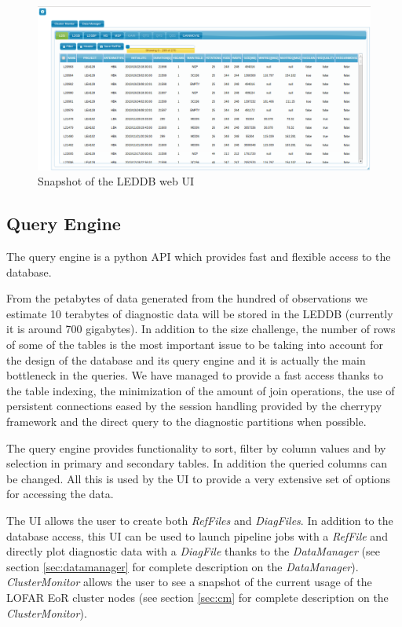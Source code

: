 \documentclass[a4paper,11pt]{article}
\begin{document}
\begin{figure}[h]
	\centering
	\includegraphics[scale=0.45]{fig/initwebui} 
	\caption{Snapshot of the LEDDB web UI}
	\label{fig:initwebui}
\end{figure}

\subsection{Query Engine}

The query engine is a python API which provides fast and flexible access to the database.

From the petabytes of data generated from the hundred of observations we estimate 10 terabytes of diagnostic data will be stored in the LEDDB (currently it is around 700 gigabytes). In addition to the size challenge, the number of rows of some of the tables is the most important issue to be taking into account for the design of the database and its query engine and it is actually the main bottleneck in the queries. We have managed to provide a fast access thanks to the table indexing, the minimization of the amount of join operations, the use of persistent connections eased by the session handling provided by the cherrypy framework and the direct query to the diagnostic partitions when possible.

The query engine provides functionality to sort, filter by column values and by selection in primary and secondary tables. In addition the queried columns can be changed. All this is used by the UI to provide a very extensive set of options for accessing the data.

The UI allows the user to create both \textit{RefFiles} and \textit{DiagFiles}. In addition to the database access, this UI can be used to launch pipeline jobs with a \textit{RefFile} and directly plot diagnostic data with a \textit{DiagFile} thanks to the \textit{DataManager} (see section \ref{sec:datamanager} for complete description on the \textit{DataManager}). \textit{ClusterMonitor} allows the user to see a snapshot of the current usage of the LOFAR EoR cluster nodes (see section \ref{sec:cm} for complete description on the \textit{ClusterMonitor}).
\end{document}
